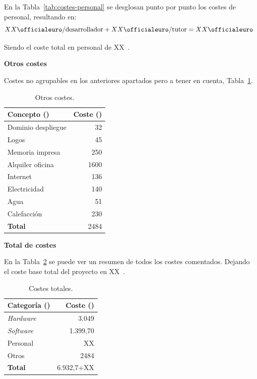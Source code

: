En la Tabla~\ref{tab:costes-personal} se desglosan punto por punto los costes de personal, resultando en:
\[ XX\text{\officialeuro/desarrollador} + XX\text{\officialeuro/tutor} = XX\text{\officialeuro}\]

Siendo el coste total en personal de XX~\officialeuro.

\textbf{Otros costes}

Costes no agrupables en los anteriores apartados pero a tener en cuenta, Tabla~\ref{tab:costes-otros}.

\begin{table}[H]
\centering
\begin{tabular}{lr}
	\toprule
	\textbf{Concepto (\officialeuro)} & \textbf{Coste (\officialeuro)} \\
	\midrule
	Dominio despliegue & 32 \\
	Logos & 45 \\
	Memoria impresa & 250 \\
	Alquiler oficina & 1600 \\
	Internet & 136\\
	Electricidad & 140 \\
	Agua & 51\\
	Calefacción & 230 \\
	\midrule
	\textbf{Total} & 2484 \\
	\bottomrule
\end{tabular}
\caption{Otros costes.}\label{tab:costes-otros}
\end{table}

\textbf{Total de  costes}

En la Tabla~\ref{tab:costes-totales} se puede ver un resumen de todos los costes comentados. Dejando el coste base total del proyecto en XX~\officialeuro.

\begin{table}[H]
\centering
\begin{tabular}{lr}
	\toprule
	\textbf{Categoría (\officialeuro)} & \textbf{Coste (\officialeuro)} \\
	\midrule
	\textit{Hardware} & 3.049 \\
	\textit{Software} & 1.399,70 \\
	Personal & XX \\
	Otros & 2484 \\
	\midrule
	\textbf{Total} & 6.932,7+XX \\
	\bottomrule
\end{tabular}
\caption{Costes totales.}\label{tab:costes-totales}
\end{table}



